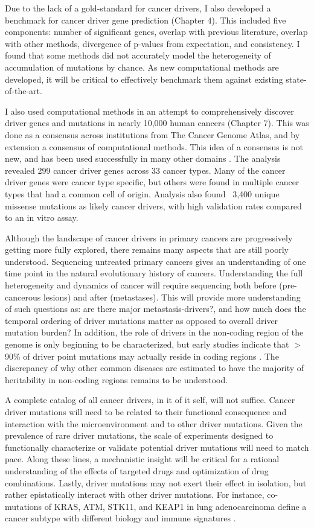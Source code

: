 Due to the lack of a gold-standard for cancer drivers, I also developed a benchmark for cancer driver gene prediction (Chapter 4). This included five components: number of significant genes, overlap with previous literature, overlap with other methods, divergence of p-values from expectation, and consistency. I found that some methods did not accurately model the heterogeneity of accumulation of mutations by chance. As new computational methods are developed, it will be critical to effectively benchmark them against existing state-of-the-art.

I also used computational methods in an attempt to comprehensively discover driver genes and mutations in nearly 10,000 human cancers (Chapter 7). This was done as a consensus across institutions from The Cancer Genome Atlas, and by extension a consensus of computational methods. This idea of a consensus is not new, and has been used successfully in many other domains \cite{RN190, RN189}. The analysis revealed 299 cancer driver genes across 33 cancer types. Many of the cancer driver genes were cancer type specific, but others were found in multiple cancer types that had a common cell of origin. Analysis also found ~3,400 unique missense mutations as likely cancer drivers, with high validation rates compared to an in vitro assay.

Although the landscape of cancer drivers in primary cancers are progressively getting more fully explored, there remains many aspects that are still poorly understood. Sequencing untreated primary cancers gives an understanding of one time point in the natural evolutionary history of cancers. Understanding the full heterogeneity and dynamics of cancer will require sequencing both before (pre-cancerous lesions) and after (metastases). This will provide more understanding of such questions as: are there major metastasis-drivers?, and how much does the temporal ordering of driver mutations matter as opposed to overall driver mutation burden? In addition, the role of drivers in the non-coding region of the genome is only beginning to be characterized, but early studies indicate that $>$90\% of driver point mutations may actually reside in coding regions \cite{RN17}. The discrepancy of why other common diseases are estimated to have the majority of heritability in non-coding regions \cite{RN192, RN193} remains to be understood.

A complete catalog of all cancer drivers, in it of it self, will not suffice. Cancer driver mutations will need to be related to their functional consequence and interaction with the microenvironment and to other driver mutations. Given the prevalence of rare driver mutations, the scale of experiments designed to functionally characterize or validate potential driver mutations will need to match pace. Along these lines, a mechanistic insight will be critical for a rational understanding of the effects of targeted drugs and optimization of drug combinations. Lastly, driver mutations may not exert their effect in isolation, but rather epistatically interact with other driver mutations. For instance, co-mutations of KRAS, ATM, STK11, and KEAP1 in lung adenocarcinoma define a cancer subtype with different biology and immune signatures \cite{RN191}.


